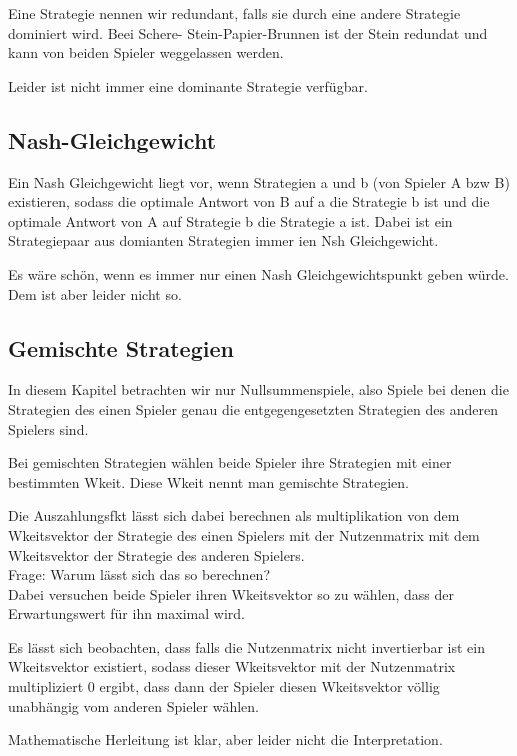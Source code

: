 \documentclass[]{article}
\begin{document}
Eine Strategie nennen wir redundant, falls sie durch eine andere Strategie dominiert wird. Beei Schere- Stein-Papier-Brunnen ist der Stein redundat und kann von beiden Spieler weggelassen werden. 

Leider ist nicht immer eine dominante Strategie verfügbar. 

\subsection{Nash-Gleichgewicht}

Ein Nash Gleichgewicht liegt vor, wenn Strategien a und b (von Spieler A bzw B) existieren, sodass die optimale Antwort von B auf a die Strategie b ist und die optimale Antwort von A auf Strategie b die Strategie a ist. Dabei ist ein Strategiepaar aus domianten Strategien immer ien Nsh Gleichgewicht. 

Es wäre schön, wenn es immer nur einen Nash Gleichgewichtspunkt geben würde. Dem ist aber leider nicht so.

\subsection{Gemischte Strategien}
In diesem Kapitel betrachten wir nur Nullsummenspiele, also Spiele bei denen die Strategien des einen Spieler genau die entgegengesetzten Strategien des anderen Spielers sind. 

Bei gemischten Strategien wählen beide Spieler ihre Strategien mit einer bestimmten Wkeit. Diese Wkeit nennt man gemischte Strategien. 

Die Auszahlungsfkt lässt sich dabei berechnen als multiplikation von dem Wkeitsvektor der Strategie des einen Spielers mit der Nutzenmatrix mit dem Wkeitsvektor der Strategie des anderen Spielers. \\

Frage: Warum lässt sich das so berechnen? \\ 

Dabei versuchen beide Spieler ihren Wkeitsvektor so zu wählen, dass der Erwartungswert für ihn maximal wird.

Es lässt sich beobachten, dass falls die Nutzenmatrix nicht invertierbar ist ein Wkeitsvektor existiert, sodass dieser Wkeitsvektor mit der Nutzenmatrix multipliziert 0 ergibt, dass dann der Spieler diesen Wkeitsvektor völlig unabhängig vom anderen Spieler wählen. 

Mathematische Herleitung ist klar, aber leider nicht die Interpretation. 
  
\end{document}
